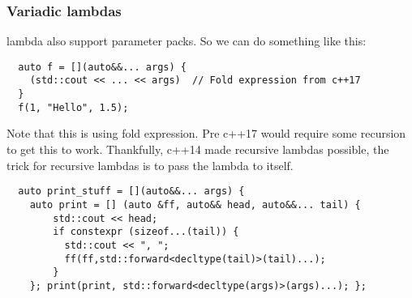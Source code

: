 \documentclass{report}
\begin{document}
\subsubsection*{Variadic lambdas}
lambda also support parameter packs. So we can do something like this:
\begin{verbatim}
  auto f = [](auto&&... args) {
    (std::cout << ... << args)  // Fold expression from c++17
  }
  f(1, "Hello", 1.5);
\end{verbatim}
Note that this is using fold expression. Pre c++17 would require some recursion to get this to work. Thankfully, c++14 made recursive lambdas possible, the trick for recursive lambdas is to pass the lambda to itself.
\begin{verbatim}
  auto print_stuff = [](auto&&... args) {
    auto print = [] (auto &ff, auto&& head, auto&&... tail) {
        std::cout << head;
        if constexpr (sizeof...(tail)) { 
          std::cout << ", ";
          ff(ff,std::forward<decltype(tail)>(tail)...);
        }
    }; print(print, std::forward<decltype(args)>(args)...); };
\end{verbatim}
\end{document}
